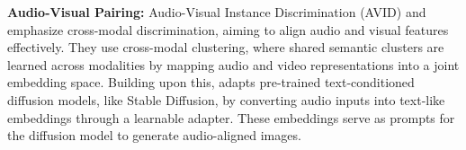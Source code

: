 

\noindent
\textbf{Audio-Visual Pairing: }
Audio-Visual Instance Discrimination (AVID) \cite{morgado2021audio} and \cite{alwassel2020self} emphasize cross-modal discrimination, aiming to align audio and visual features effectively. They use cross-modal clustering, where shared semantic clusters are learned across modalities by mapping audio and video representations into a joint embedding space. Building upon this, \cite{yariv2023audiotoken} adapts pre-trained text-conditioned diffusion models, like Stable Diffusion, by converting audio inputs into text-like embeddings through a learnable adapter. These embeddings serve as prompts for the diffusion model to generate audio-aligned images.